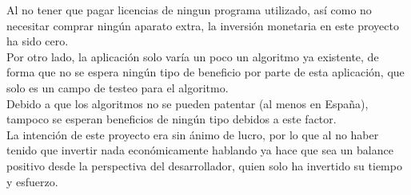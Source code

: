 \quad Al no tener que pagar licencias de ningun programa utilizado, así como no necesitar comprar ningún aparato extra, la inversión monetaria en este proyecto ha sido cero.\\

\quad Por otro lado, la aplicación solo varía un poco un algoritmo ya existente, de forma que no se espera ningún tipo de beneficio por parte de esta aplicación, que solo es un campo de testeo para el algoritmo. \\

\quad Debido a que los algoritmos no se pueden patentar (al menos en España), tampoco se esperan beneficios de ningún tipo debidos a este factor.\\

\quad La intención de este proyecto era sin ánimo de lucro, por lo que al no haber tenido que invertir nada económicamente hablando ya hace que sea un balance positivo desde la perspectiva del desarrollador, quien solo ha invertido su tiempo y esfuerzo.\\ 

\newpage




